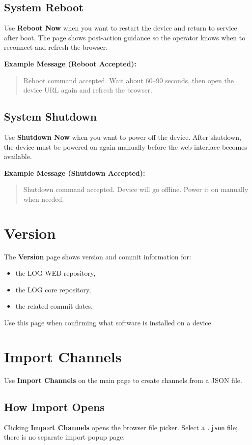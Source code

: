 \documentclass[11pt,a4paper]{article}
\newcommand{\messageexample}[2]{%
\noindent\textbf{Example Message (#1):}\\%
\begin{quote}\raggedright #2\end{quote}%
}
\begin{document}
\subsection{System Reboot}
Use \textbf{Reboot Now} when you want to restart the device and return to service after boot. The page shows post-action guidance so the operator knows when to reconnect and refresh the browser.

\messageexample{Reboot Accepted}{Reboot command accepted. Wait about 60--90 seconds, then open the device URL again and refresh the browser.}

\subsection{System Shutdown}
Use \textbf{Shutdown Now} when you want to power off the device. After shutdown, the device must be powered on again manually before the web interface becomes available.

\messageexample{Shutdown Accepted}{Shutdown command accepted. Device will go offline. Power it on manually when needed.}

\section{Version}
The \textbf{Version} page shows version and commit information for:

\begin{itemize}
\item the LOG WEB repository,
\item the LOG core repository,
\item the related commit dates.
\end{itemize}

Use this page when confirming what software is installed on a device.

\section{Import Channels}
Use \textbf{Import Channels} on the main page to create channels from a JSON file.

\subsection{How Import Opens}
Clicking \textbf{Import Channels} opens the browser file picker. Select a \texttt{.json} file; there is no separate import popup page.
\end{document}

